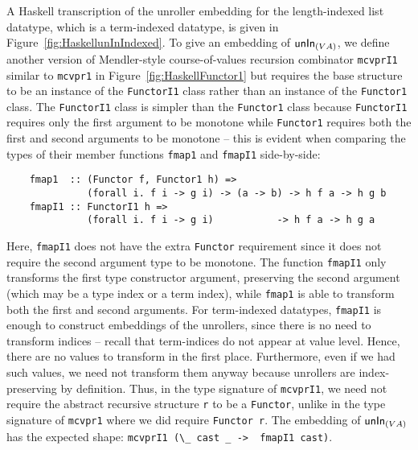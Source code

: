 A Haskell transcription of the unroller embedding for the length-indexed
list datatype, which is a term-indexed datatype, is given
in Figure~\ref{fig:HaskellunInIndexed}. To give an embedding of
$\mathsf{unIn}_{(V A)}$, we define another version of Mendler-style course-of-values
recursion combinator \texttt{mcvprI1} similar to \texttt{mcvpr1}
in Figure~\ref{fig:HaskellFunctor1} but requires the base structure
to be an instance of the \texttt{FunctorI1} class rather than an instance of
the \texttt{Functor1} class. The \texttt{FunctorI1} class is simpler than
the \texttt{Functor1} class because \texttt{FunctorI1} requires only the first
argument to be monotone while \texttt{Functor1} requires both the first and
second arguments to be monotone -- this is evident when comparing
the types of their member functions \texttt{fmap1} and \texttt{fmapI1}
side-by-side:
\begin{lstlisting}
    fmap1  :: (Functor f, Functor1 h) =>
              (forall i. f i -> g i) -> (a -> b) -> h f a -> h g b
    fmapI1 :: FunctorI1 h =>
              (forall i. f i -> g i)           -> h f a -> h g a
\end{lstlisting}
Here, \texttt{fmapI1} does not have the extra \texttt{Functor}
requirement since it does not require the second argument type
to be monotone. The function \texttt{fmapI1} only transforms the first type
constructor argument, preserving the second argument (which may be
a type index or a term index), while \texttt{fmap1} is able to transform
both the first and second arguments. For term-indexed datatypes,
\texttt{fmapI1} is enough to construct embeddings of the unrollers,
since there is no need to transform indices -- recall that term-indices
do not appear at value level. Hence, there are no values to transform
in the first place. Furthermore, even if we had such values, we need not
transform them anyway because unrollers are index-preserving by definition.
Thus, in the type signature of \texttt{mcvprI1}, we need not require
the abstract recursive structure \texttt{r} to be a \texttt{Functor},
unlike in the type signature of \texttt{mcvpr1} where we did require
\texttt{Functor r}. The embedding of $\mathsf{unIn}_{(V A)}$ has the  expected shape:
\lstinline$mcvprI1 (\_ cast _ ->  fmapI1 cast)$.

